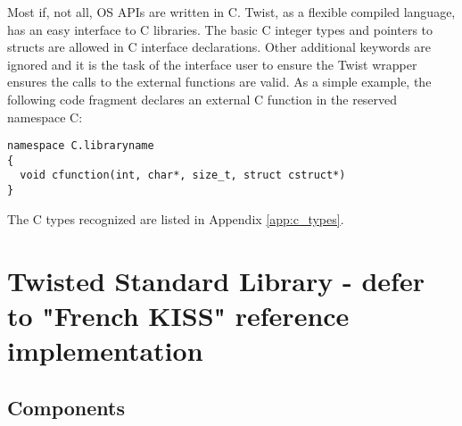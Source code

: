 \documentclass[a4paper,11pt]{report}
\begin{document}
Most if, not all, OS APIs are written in C.
Twist, as a flexible compiled language, has an easy interface to C libraries.
The basic C integer types and pointers to structs are allowed in C interface declarations.
Other additional keywords are ignored and it is the task of the interface user to ensure the Twist wrapper ensures the calls to the external functions are valid.
As a simple example, the following code fragment declares an external C function in the reserved namespace C:
\begin{lstlisting}
namespace C.libraryname
{
  void cfunction(int, char*, size_t, struct cstruct*)
}
\end{lstlisting}
The C types recognized are listed in Appendix \ref{app:c_types}.

\section{Twisted Standard Library -  defer to "French KISS" reference implementation}
  \subsection{Components}
\end{document}
